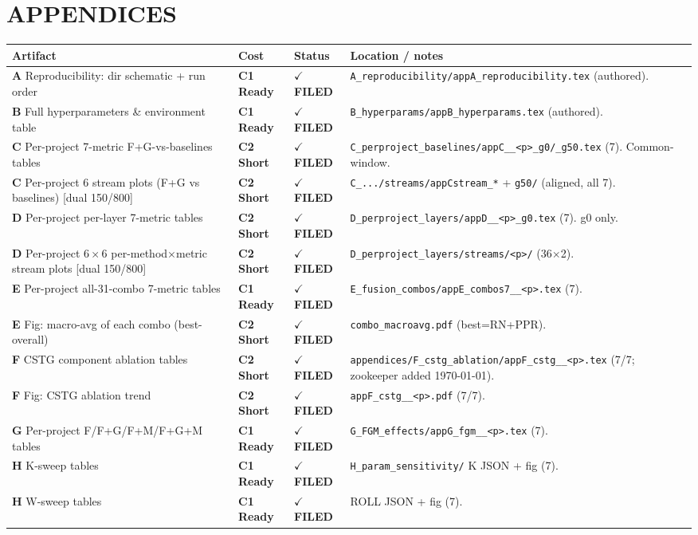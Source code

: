 \documentclass[10pt]{article}
\providecommand{\code}[1]{\texttt{\small #1}}
\newcommand{\Cone}{\textcolor{green!50!black}{\textbf{C1 Ready}}}
\newcommand{\Ctwo}{\textcolor{blue!65!black}{\textbf{C2 Short}}}
\newcommand{\dual}{\textcolor{purple!70!black}{[dual 150/800]}}
\newcommand{\DONE}{\textcolor{green!45!black}{\textbf{$\checkmark$ FILED}}}
\begin{document}
\section*{APPENDICES}
\begin{longtable}{p{7.0cm}p{1.4cm}p{1.6cm}p{5.4cm}}
\toprule
Artifact & Cost & Status & Location / notes \\ \midrule\endhead
\textbf{A} Reproducibility: dir schematic + run order & \Cone & \DONE & \code{A\_reproducibility/appA\_reproducibility.tex} (authored). \\
\textbf{B} Full hyperparameters \& environment table & \Cone & \DONE & \code{B\_hyperparams/appB\_hyperparams.tex} (authored). \\
\textbf{C} Per-project 7-metric F+G-vs-baselines tables & \Ctwo & \DONE & \code{C\_perproject\_baselines/appC\_\_<p>\_g0/\_g50.tex} (7). Common-window. \\
\textbf{C} Per-project 6 stream plots (F+G vs baselines) \dual & \Ctwo & \DONE & \code{C\_.../streams/appCstream\_*} + \code{g50/} (aligned, all 7). \\
\textbf{D} Per-project per-layer 7-metric tables & \Ctwo & \DONE & \code{D\_perproject\_layers/appD\_\_<p>\_g0.tex} (7). g0 only. \\
\textbf{D} Per-project $6\times6$ per-method$\times$metric stream plots \dual & \Ctwo & \DONE & \code{D\_perproject\_layers/streams/<p>/} (36$\times$2). \\
\textbf{E} Per-project all-31-combo 7-metric tables & \Cone & \DONE & \code{E\_fusion\_combos/appE\_combos7\_\_<p>.tex} (7). \\
\textbf{E} Fig: macro-avg of each combo (best-overall) & \Ctwo & \DONE & \code{combo\_macroavg.pdf} (best=RN+PPR). \\
\textbf{F} CSTG component ablation tables & \Ctwo & \DONE & \code{appendices/F\_cstg\_ablation/appF\_cstg\_\_<p>.tex} (7/7; zookeeper added \today). \\
\textbf{F} Fig: CSTG ablation trend & \Ctwo & \DONE & \code{appF\_cstg\_\_<p>.pdf} (7/7). \\
\textbf{G} Per-project F/F+G/F+M/F+G+M tables & \Cone & \DONE & \code{G\_FGM\_effects/appG\_fgm\_\_<p>.tex} (7). \\
\textbf{H} K-sweep tables & \Cone & \DONE & \code{H\_param\_sensitivity/} K JSON + fig (7). \\
\textbf{H} W-sweep tables & \Cone & \DONE & ROLL JSON + fig (7). \\

\end{longtable}
\end{document}
